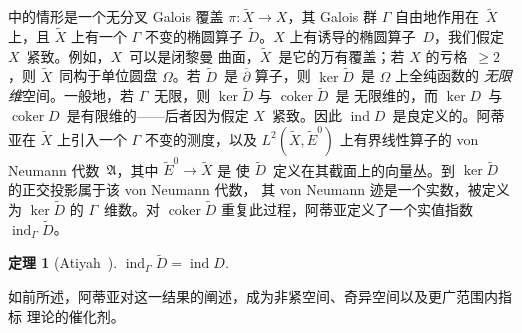 \documentclass[11pt]{amsart}
\theoremstyle{definition}
\theoremstyle{remark}
\theoremstyle{plain}
\newtheorem{theorem}[equation]{定理}
\numberwithin{equation}{section}
\renewcommand{\:}{\colon}
\newcommand{\ZZ}{{\mathbb Z}}
\DeclareMathOperator{\coker}{coker}
\newcommand{\dbar}{{\overline\partial}}
\DeclareMathOperator{\ind}{ind}
\newcommand{\ssA}{\mathfrak{A}}
\newcommand{\tD}{\widetilde{D}}
\newcommand{\tE}{\widetilde{E}}
\newcommand{\tX}{\widetilde{X}}
\begin{document}
\cite{A5} 中的情形是一个无分叉 Galois 覆盖 $\pi \:\tX\to X$，其 Galois 群
$\Gamma $ 自由地作用在~$\tX$ 上，且 $\tX$ 上有一个 $\Gamma $ 不变的椭圆算子
$\tD$。$X$ 上有诱导的椭圆算子~$D$，我们假定 $X$~紧致。例如，$X$~可以是闭黎曼
曲面，$\tX$~是它的万有覆盖；若 $X$ 的亏格~$\ge2$，则 $\tX$~同构于单位圆盘
$\Omega $。若 $\tD$~是 $\dbar$ 算子，则 $\ker\tD$~是 $\Omega $ 上全纯函数的
\emph{无限维}空间。一般地，若 $\Gamma $~无限，则 $\ker\tD$ 与 $\coker\tD$~是
无限维的，而 $\ker D$~与 $\coker D$~是有限维的——后者因为假定 $X$~紧致。因此
$\ind D$~是良定义的。阿蒂亚在 $\tX$ 上引入一个 $\Gamma $ 不变的测度，以及
$L^2(\tX,\tE^0)$ 上有界线性算子的 von Neumann 代数~$\ssA$，其中 $\tE^0\to\tX$ 是
使 $\tD$~定义在其截面上的向量丛。到 $\ker\tD$ 的正交投影属于该 von Neumann 代数，
其 von Neumann 迹是一个实数，被定义为 $\ker\tD$ 的 $\Gamma $~维数。对 $\coker\tD$
重复此过程，阿蒂亚定义了一个实值指数 $\ind_\Gamma \tD$。

  \begin{theorem}[Atiyah~\cite{A5}]\label{thm:12}
 $\ind_\Gamma \tD = \ind D$. 
  \end{theorem}

\noindent
如前所述，阿蒂亚对这一结果的阐述，成为非紧空间、奇异空间以及更广范围内指标
理论的催化剂。

\end{document}
